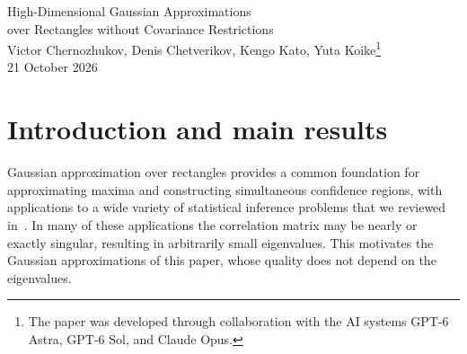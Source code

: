 \documentclass[11pt,letterpaper]{article}
\newif\ifshowskill
\newcommand{\skl}[1]{\ifshowskill{\color{revblue}%
\hypersetup{linkcolor=revblue,citecolor=revblue,urlcolor=revblue}#1}\else#1\fi}
\newcommand{\sks}[1]{\ifshowskill{\color{revblue}#1}\else#1\fi}
\newenvironment{skillblock}{\ifshowskill\color{revblue}%
\hypersetup{linkcolor=revblue,citecolor=revblue,urlcolor=revblue}\fi}{}
\newif\ifshownat
\newcommand{\nat}[1]{\ifshownat{\color{revblue}%
\hypersetup{linkcolor=revblue,citecolor=revblue,urlcolor=revblue}#1}\else#1\fi}
\newif\ifshowabstract
\newcommand{\abt}[1]{\ifshowabstract{\color{revblue}#1}\else#1\fi}
\newif\ifshowintro
\newcommand{\itx}[1]{\ifshowintro{\color{revblue}%
\hypersetup{linkcolor=revblue,citecolor=revblue,urlcolor=revblue}#1}\else#1\fi}
\theoremstyle{remark}
\newcommand{\E}{\mathbb E}
\newcommand{\Pp}{\mathbb P}
\newcommand{\R}{\mathbb R}
\begin{document}
\begin{center}
{\Large High-Dimensional Gaussian Approximations\\[0.15em]
over Rectangles without Covariance Restrictions}\\[0.85em]
{\normalsize Victor Chernozhukov, Denis Chetverikov, Kengo Kato, Yuta
Koike\renewcommand{\thefootnote}{\fnsymbol{footnote}}\footnote{\skl{The paper
was developed through collaboration with the AI systems GPT-6 Astra,
GPT-6 Sol, and Claude Opus.}}}\\[0.65em]
{\normalsize 21 October 2026}
\end{center}
\setcounter{footnote}{0}
\thispagestyle{plain}

\begin{abstract}
\begin{skillblock} \nat{This paper studies} the Gaussian approximation of sums of independent bounded random
vectors over rectangles, with no assumption on the \abt{correlation} matrix,
which may be singular. Let \(X_1,\ldots,X_n\) be independent centered
random vectors in \(\R^p\) whose coordinates \(X_{ij}\) are bounded in
absolute value by a constant~\(B\), and suppose that each coordinate of
\(W_n=n^{-1/2}(X_1+\cdots+X_n)\) has unit variance. Let \(Z_n\) be a
centered Gaussian vector with the covariance matrix of \(W_n\), and put
\(L=\log(ep)\) and \(\log_+x=\max\{0,\log x\}\). The largest difference
between \(\Pp(W_n\in A)\) and \(\Pp(Z_n\in A)\) over rectangles \(A\) is
at most
\[
 \frac{\abt{B}L^{3/2}}{\sqrt n}\sqrt{1+\log_+\sqrt{n/L}},
\]
\abt{up to a numerical constant}. If, for a fixed \(c_0>0\), no two
coordinates have correlation larger than \(1-c_0\) in absolute value, the
bound improves slightly. When \(p\) grows
polynomially in~\(n\), the two bounds are of order \(n^{-1/2}(\log n)^2\) and
\(n^{-1/2}(\log n)^{3/2}\), respectively. A further \abt{refinement} holds if the
third moments cancel in aggregate, that is, if
\(\sum_i\E[X_{ij}X_{ik}X_{i\ell}]=0\) for all coordinates \(j,k,\ell\).
\abt{The factor \(BL^{3/2}/\sqrt n\) cannot be improved in general}, so the
second rate is then optimal and the first is optimal up to the factor
\((\log n)^{1/2}\).
\end{skillblock}
\end{abstract}

\clearpage
\tableofcontents
\clearpage

\section{\texorpdfstring{\sks{Introduction and main results}}{Introduction and main results}}\label{sec:results}
Gaussian approximation over rectangles provides a common foundation for
approximating maxima and constructing simultaneous confidence regions\itx{, with
applications to a wide variety of statistical inference problems that we
reviewed in~\cite{CCKK2023}}.
\itx{In many of these applications the correlation matrix may be nearly or
exactly singular, resulting in arbitrarily small eigenvalues. This motivates the
Gaussian approximations of this paper, whose quality does not depend on the
eigenvalues.}
\end{document}
